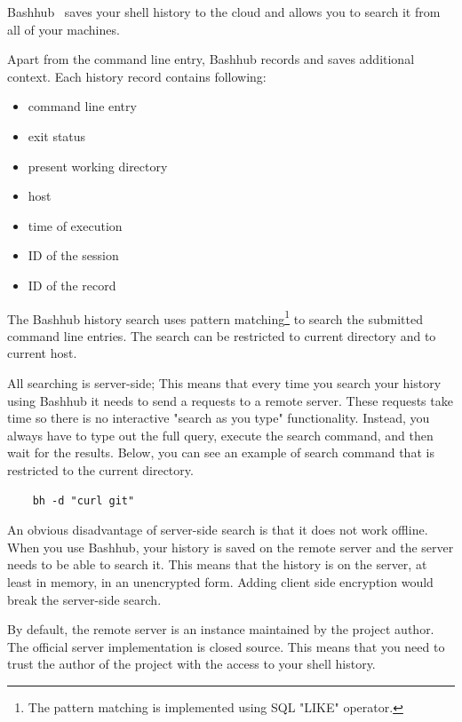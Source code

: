 \documentclass[thesis=M,english]{FITthesis}[2012/10/20]
\let\myCite\cite
\renewcommand\cite{\unskip~\myCite}
\begin{document}
Bashhub\cite{toolsbashhubclient} saves your shell history to the cloud and allows you to search it from all of your machines.

Apart from the command line entry, Bashhub records and saves additional context. Each history record contains following:
\begin{itemize}
    \item command line entry
    \item exit status
    \item present working directory
    \item host
    \item time of execution
    \item ID of the session
    \item ID of the record
\end{itemize}

The Bashhub history search uses pattern matching\footnote{The pattern matching is implemented using SQL "LIKE" operator.} to search the submitted command line entries. The search can be restricted to current directory and to current host.


All searching is server-side; This means that every time you search your history using Bashhub it needs to send a requests to a remote server.
These requests take time so there is no interactive "search as you type" functionality. Instead, you always have to type out the full query, execute the search command, and then wait%
for the results. Below, you can see an example of search command that is restricted to the current directory. 

\begin{verbatim}
    bh -d "curl git"
\end{verbatim}

An obvious disadvantage of server-side search is that it does not work offline. 
When you use Bashhub, your history is saved on the remote server and the server needs to be able to search it. This means that the history is on the server, at least in memory, in an unencrypted form. Adding client side encryption would break the server-side search.

By default, the remote server is an instance maintained by the project author. The official server implementation is closed source. This means that you need to trust the author of the project with the access to your shell history. 
\end{document}

